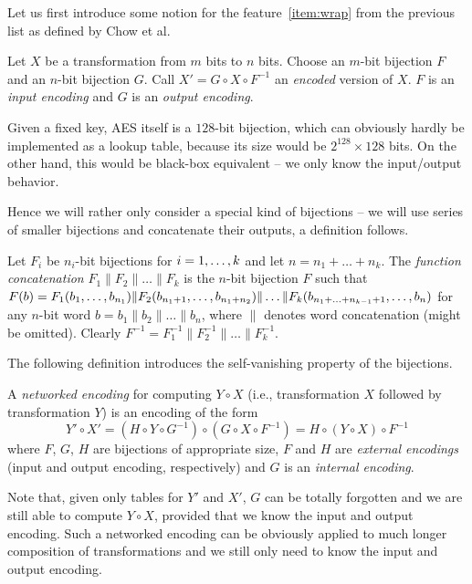 Let us first introduce some notion for the feature~\ref{item:wrap} from the previous list as defined by Chow et al.

\begin{defn}[Encoding]
	Let $X$ be a transformation from $m$ bits to $n$ bits. Choose an $m$-bit bijection $F$ and an $n$-bit bijection $G$. Call $X' = G \circ X \circ F^{-1}$ an {\em encoded} version of $X$. $F$ is an {\em input encoding} and $G$ is an {\em output encoding}.
\end{defn}

\begin{note}
	Given a fixed key, AES itself is a $128$-bit bijection, which can obviously hardly be implemented as a lookup table, because its size would be $2^{128}\times 128$ bits. On the other hand, this would be black-box equivalent -- we only know the input/output behavior.
	
	Hence we will rather only consider a special kind of bijections -- we will use series of smaller bijections and concatenate their outputs, a definition follows.
\end{note}

\begin{defn}
\label{def:concat}
	Let $F_i$ be $n_i$-bit bijections for $i=1 , \ldots , k$ and let $n = n_1 + \ldots + n_k$. The {\em function concatenation} $F_1 \| F_2 \| \ldots \| F_k$ is the $n$-bit bijection $F$ such that $F(b) = F_1(b_1 , \ldots , b_{n_1})\| F_2(b_{n_1+1} , \ldots , b_{n_1+n_2})\|\ldots\| F_k(b_{n_1+\ldots+n_{k-1}+1} , \ldots , b_n)$ for any $n$-bit word $b=b_1\|b_2\|\ldots\|b_n$, where $\|$ denotes word concatenation (might be omitted). Clearly $F^{-1} = F_1^{-1}\| F_2^{-1}\| \ldots \|F_k^{-1}$.
\end{defn}

The following definition introduces the self-vanishing property of the bijections.

\begin{defn}
\label{def:netw}
	A {\em networked encoding} for computing $Y\circ X$ (i.e., transformation $X$ followed by transformation $Y$) is an encoding of the form
	\[
		Y'\circ X' = (H\circ Y\circ G^{-1})\circ(G\circ X\circ F^{-1}) = H\circ(Y\circ X)\circ F^{-1}
	\]
	where $F$, $G$, $H$ are bijections of appropriate size, $F$ and $H$ are {\em external encodings} (input and output encoding, respectively) and $G$ is an {\em internal encoding}.
\end{defn}

Note that, given only tables for $Y'$ and $X'$, $G$ can be totally forgotten and we are still able to compute $Y\circ X$, provided that we know the input and output encoding. Such a networked encoding can be obviously applied to much longer composition of transformations and we still only need to know the input and output encoding.


